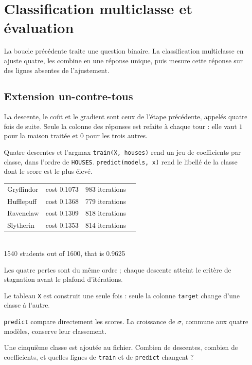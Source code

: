 \chapter{Classification multiclasse et évaluation}
\label{ch:predire}


La boucle précédente traite une question binaire. La classification multiclasse
en ajuste quatre, les combine en une réponse unique, puis mesure cette réponse
sur des lignes absentes de l'ajustement.

\section{Extension un-contre-tous}

La descente, le coût et le gradient sont ceux de l'étape précédente, appelés
quatre fois de suite. Seule la colonne des réponses est refaite à chaque tour :
elle vaut $1$ pour la maison traitée et $0$ pour les trois autres.

\begin{tache}{Quatre descentes et l'argmax}
 \texttt{train(X, houses)} rend un jeu de coefficients par classe,
dans l'ordre de \texttt{HOUSES}. \texttt{predict(models, x)} rend le libellé de
la classe dont le score est le plus élevé.

\begin{center}\ttfamily\footnotesize
\begin{tabular}{@{}llll@{}}
Gryffindor & cost 0.1073 & 983 iterations\\
Hufflepuff & cost 0.1368 & 779 iterations\\
Ravenclaw & cost 0.1309 & 818 iterations\\
Slytherin & cost 0.1353 & 814 iterations\\
\end{tabular}\\[3pt]
1540 students out of 1600, that is 0.9625
\end{center}
Les quatre pertes sont du même ordre ; chaque descente atteint le critère de
stagnation avant le plafond d'itérations.

 Le tableau \texttt{X} est construit une seule fois : seule la
colonne \texttt{target} change d'une classe à l'autre.

 \texttt{predict} compare directement les scores. La croissance
de $\sigma$, commune aux quatre modèles, conserve leur classement.

 Une cinquième classe est ajoutée au fichier. Combien de
descentes, combien de coefficients, et quelles lignes de \texttt{train} et de
\texttt{predict} changent ?
\end{tache}

